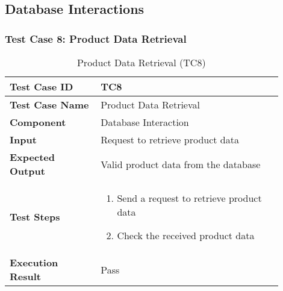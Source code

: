 \pagebreak
\subsection{Database Interactions}

\begin{table}[h]
	\subsubsection{Test Case 8: Product Data Retrieval}
	\centering
	\caption{Product Data Retrieval (TC8)}
	\begin{tabular}{|p{0.3\linewidth}|p{0.6\linewidth}|}
		\hline
		\textbf{Test Case ID} & TC8 \\
		\hline
		\textbf{Test Case Name} & Product Data Retrieval \\
		\hline
		\textbf{Component} & Database Interaction \\
		\hline
		\textbf{Input} & Request to retrieve product data \\
		\hline
		\textbf{Expected Output} & Valid product data from the database \\
		\hline
		\textbf{Test Steps} & \begin{enumerate}
			\item Send a request to retrieve product data	
			\item Check the received product data
		\end{enumerate}\\
		\hline
		\textbf{Execution Result} & Pass \\
		\hline
	\end{tabular}
\end{table}


